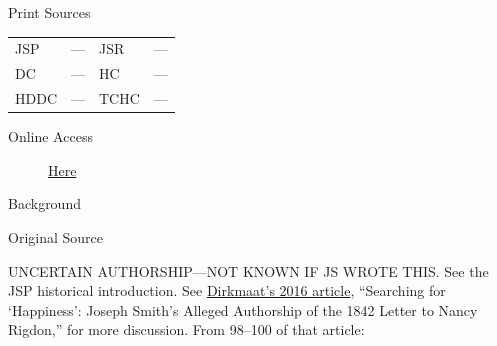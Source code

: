 			\begin{description}
				\item[Print Sources]
			\end{description}

			\begin{tabular}{p{0.5in}p{1in}p{0.5in}p{1in}}
				JSP	 	& ---		& JSR 		& --- \\
				DC	 	& ---		& HC 		& --- \\
				HDDC 	& ---		& TCHC 		& --- \\
			\end{tabular}
			
			\begin{description}
				\item[Online Access] \href{https://www.josephsmithpapers.org/paper-summary/appendix-letter-to-nancy-rigdon-circa-mid-april-1842/1}{Here}
			\end{description}
			
			\begin{description}
				\item[Background]
			\end{description}
			
			
			\begin{description}
				\item[Original Source]
			\end{description}
			
				UNCERTAIN AUTHORSHIP---NOT KNOWN IF JS WROTE THIS. See the JSP historical introduction. See \href{https://drive.google.com/file/d/19dBq4Oej0R_q5ndI3bEY5R_1WRhYRbKI/view?usp=sharing}{Dirkmaat's 2016 article}, ``Searching for `Happiness': Joseph Smith's Alleged Authorship of the 1842 Letter to Nancy Rigdon,'' for more discussion. From 98--100 of that article:
				
